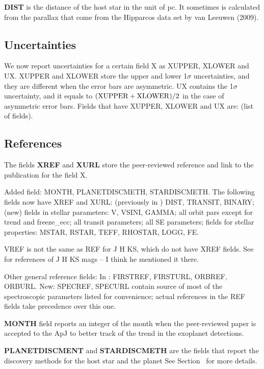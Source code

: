 \documentclass[11pt,preprint]{aastex}
\begin{document}
\begin{CJK*}{UTF8}{gbsn}
{\bf DIST} is the distance of the host star in the unit of pc. It sometimes is calculated from the parallax that come from the Hipparcos data set by van Leeuwen (2009).


\subsection{Uncertainties}

We now report uncertainties for a certain field X as XUPPER, XLOWER
and UX. XUPPER and XLOWER store the upper and lower 1$\sigma$
uncertainties, and they are different when the error bars are
asymmetric. UX contains the 1$\sigma$ uncertainty, and it
equals to $({\rm XUPPER+XLOWER})/2$ in the case of asymmetric error
bars. Fields that have XUPPER, XLOWER and UX are: (list of fields).

\subsection{References}

The fields {\bf XREF} and {\bf XURL} store the peer-reviewed reference and link to
the publication for the field X. 

Added field: MONTH, PLANETDISCMETH, STARDISCMETH.
The following fields now have XREF and XURL: (previously in \cite{Wright2011}) DIST, TRANSIT, BINARY; (new) fields in stellar parameters: V, VSINI, GAMMA; all orbit pars except for trend and freeze\_ecc; all transit parameters; all SE parameters; fields for stellar properties: MSTAR, RSTAR, TEFF, RHOSTAR, LOGG, FE.

VREF is not the same as REF for J H KS, which do not have XREF
fields. See \cite{Wright2011} for references of J H KS mags -- I think
he mentioned it there.

Other general reference fields: In \cite{Wright2011}: FIRSTREF,
FIRSTURL, ORBREF, ORBURL. New: SPECREF, SPECURL contain source of most
of the spectroscopic parameters listed for convenience; actual
references in the REF fields take precedence over this one.

{\bf MONTH} field reports an integer of the month when the peer-reviewed paper is accepted to the
ApJ to better track of the trend in the exoplanet detections. 

{\bf PLANETDISCMENT} and {\bf STARDISCMETH} are the fields that report the discovery methods for the host star and the planet See Section~ for more details.  



\end{CJK*}
\end{document}
